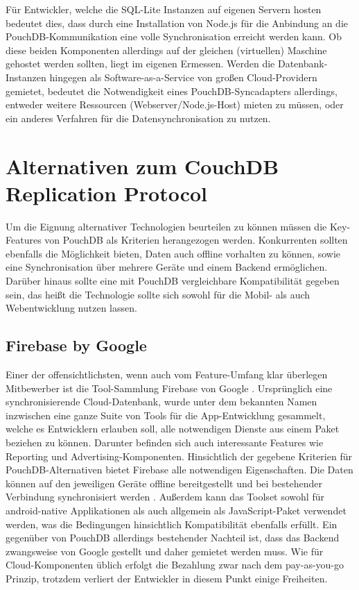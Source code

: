 Für Entwickler, welche die SQL-Lite Instanzen auf eigenen Servern hosten bedeutet dies, dass durch eine Installation von Node.js für die Anbindung an die PouchDB-Kommunikation eine volle Synchronisation erreicht werden kann. Ob diese beiden Komponenten allerdings auf der gleichen (virtuellen) Maschine gehostet werden sollten, liegt im eigenen Ermessen. Werden die Datenbank-Instanzen hingegen als Software-as-a-Service von großen Cloud-Providern gemietet, bedeutet die Notwendigkeit eines PouchDB-Syncadapters allerdings, entweder weitere Ressourcen (Webserver/Node.js-Host) mieten zu müssen, oder ein anderes Verfahren für die Datensynchronisation zu nutzen.

\section{Alternativen zum CouchDB Replication Protocol}
Um die Eignung alternativer Technologien beurteilen zu können müssen die Key-Features von PouchDB als Kriterien herangezogen werden. Konkurrenten sollten ebenfalls die Möglichkeit bieten, Daten auch offline vorhalten zu können, sowie eine Synchronisation über mehrere Geräte und einem Backend ermöglichen. Darüber hinaus sollte eine mit PouchDB vergleichbare Kompatibilität gegeben sein, das heißt die Technologie sollte sich sowohl für die Mobil- als auch Webentwicklung nutzen lassen.

\subsection{Firebase by Google}
Einer der offensichtlichsten, wenn auch vom Feature-Umfang klar überlegen Mitbewerber ist die Tool-Sammlung Firebase von Google \cite{google:firebase}. Ursprünglich eine synchronisierende Cloud-Datenbank, wurde unter dem bekannten Namen inzwischen eine ganze Suite von Tools für die App-Entwicklung gesammelt, welche es Entwicklern erlauben soll, alle notwendigen Dienste aus einem Paket beziehen zu können. Darunter befinden sich auch interessante Features wie Reporting und Advertising-Komponenten. Hinsichtlich der gegebene Kriterien für PouchDB-Alternativen bietet Firebase alle notwendigen Eigenschaften. Die Daten können auf den jeweiligen Geräte offline bereitgestellt und bei bestehender Verbindung synchronisiert werden \cite{google:offlinejs}\cite{google:offlineandroid}. Außerdem kann das Toolset sowohl für android-native Applikationen als auch allgemein als JavaScript-Paket verwendet werden, was die Bedingungen hinsichtlich Kompatibilität ebenfalls erfüllt. Ein gegenüber von PouchDB allerdings bestehender Nachteil ist, dass das Backend zwangsweise von Google gestellt und daher gemietet werden muss. Wie für Cloud-Komponenten üblich erfolgt die Bezahlung zwar nach dem pay-as-you-go Prinzip, trotzdem verliert der Entwickler in diesem Punkt einige Freiheiten.

